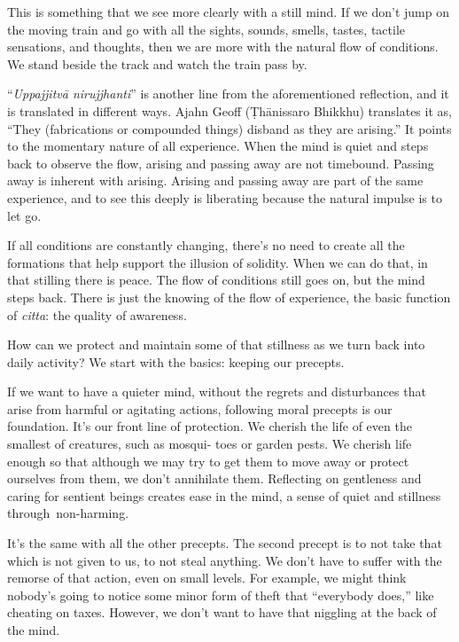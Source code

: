 This is something that we see more clearly with a still mind. If we don't jump on the moving train and go with all the sights, sounds, smells, tastes, tactile sensations, and thoughts, then we are more with the natural flow of conditions. We stand beside the track and watch the train pass by.

``\emph{Uppajjitvā nirujjhanti}'' is another line from the aforementioned reflection, and it is translated in different ways. Ajahn Geoff (Ṭhānissaro Bhikkhu) translates \linebreak it as, ``They (fabrications or compounded things) disband as they are arising.'' It points to the momentary nature of all experience. When the mind is quiet and steps back to observe the flow, arising and passing away are not timebound. Passing away is inherent with arising. Arising and passing away are part of the same experience, and to see this deeply is liberating because the natural impulse is to let go.

If all conditions are constantly changing, there's no need to create all the formations that help support the illusion of solidity. When we can do that, in that stilling there is peace. The flow of conditions still goes on, but the mind steps back. There is just the knowing of the flow of experience, the basic function of \emph{citta}: the quality of awareness.

How can we protect and maintain some of that stillness as we turn back into daily activity? We start with the basics: keeping our precepts.

If we want to have a quieter mind, without the regrets and disturbances that arise from harmful or agitating actions, following moral precepts is our foundation. It's our front line of protection. We cherish the life of even the smallest of creatures, such as mosqui- \linebreak toes or garden pests. We cherish life enough so that although we may try to get them to move away or protect ourselves from them, we don't annihilate them. Reflecting on gentleness and caring for sentient beings creates ease in the mind, a sense of quiet and stillness \mbox{through non-harming.}

It's the same with all the other precepts. The second precept is to not take that which is not given to us, to not steal anything. We don't have to suffer with the remorse of that action, even on small levels. For example, we might think nobody's going to notice some minor form of theft that ``everybody does,'' like cheating on taxes. However, we don't want to have that niggling at the back of the mind.

